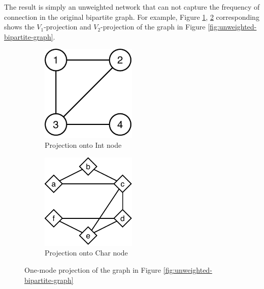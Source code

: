 The result is simply an unweighted network that can not capture the frequency of connection in the original bipartite graph.
For example, Figure \ref{fig:Intprojection}, \ref{fig:Charprojection} corresponding shows the $V_1$-projection and $V_2$-projection of the graph in Figure \ref{fig:unweighted-bipartite-graph}.

\begin{figure}[H]
	\centering
	\begin{subfigure}[b]{0.4\textwidth}
		\centering
		\includegraphics[width=0.5\textwidth]{images/bipartite-projection-number.pdf}
		\caption{Projection onto Int node}
		\label{fig:Intprojection}
	\end{subfigure}
	\begin{subfigure}[b]{0.4\textwidth}
		\centering
		\includegraphics[width=0.5\textwidth]{images/bipartite-projection-char.pdf}
		\caption{Projection onto Char node}
		\label{fig:Charprojection}
	\end{subfigure}
	\caption{One-mode projection of the graph in Figure \ref{fig:unweighted-bipartite-graph}}
	\label{fig:projection}
\end{figure}

